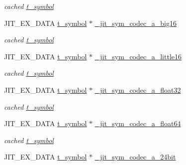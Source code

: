 \begin{DoxyCompactItemize}
\begin{DoxyCompactList}\small\item\em cached \hyperlink{structt__symbol}{t\_\-symbol} \item\end{DoxyCompactList}\item 
\hypertarget{group__jitter_ga95acadbe30725ccc610bec32f125706b}{
JIT\_\-EX\_\-DATA \hyperlink{structt__symbol}{t\_\-symbol} $\ast$ \hyperlink{group__jitter_ga95acadbe30725ccc610bec32f125706b}{\_\-jit\_\-sym\_\-codec\_\-a\_\-big16}}
\label{group__jitter_ga95acadbe30725ccc610bec32f125706b}

\begin{DoxyCompactList}\small\item\em cached \hyperlink{structt__symbol}{t\_\-symbol} \item\end{DoxyCompactList}\item 
\hypertarget{group__jitter_ga168b47dccac2a7b92bf74c9dc2e58378}{
JIT\_\-EX\_\-DATA \hyperlink{structt__symbol}{t\_\-symbol} $\ast$ \hyperlink{group__jitter_ga168b47dccac2a7b92bf74c9dc2e58378}{\_\-jit\_\-sym\_\-codec\_\-a\_\-little16}}
\label{group__jitter_ga168b47dccac2a7b92bf74c9dc2e58378}

\begin{DoxyCompactList}\small\item\em cached \hyperlink{structt__symbol}{t\_\-symbol} \item\end{DoxyCompactList}\item 
\hypertarget{group__jitter_ga4a788b64cf74f82a96a5a16b5ccef259}{
JIT\_\-EX\_\-DATA \hyperlink{structt__symbol}{t\_\-symbol} $\ast$ \hyperlink{group__jitter_ga4a788b64cf74f82a96a5a16b5ccef259}{\_\-jit\_\-sym\_\-codec\_\-a\_\-float32}}
\label{group__jitter_ga4a788b64cf74f82a96a5a16b5ccef259}

\begin{DoxyCompactList}\small\item\em cached \hyperlink{structt__symbol}{t\_\-symbol} \item\end{DoxyCompactList}\item 
\hypertarget{group__jitter_ga82c22b2f399ca7ff872cfa95b12358ee}{
JIT\_\-EX\_\-DATA \hyperlink{structt__symbol}{t\_\-symbol} $\ast$ \hyperlink{group__jitter_ga82c22b2f399ca7ff872cfa95b12358ee}{\_\-jit\_\-sym\_\-codec\_\-a\_\-float64}}
\label{group__jitter_ga82c22b2f399ca7ff872cfa95b12358ee}

\begin{DoxyCompactList}\small\item\em cached \hyperlink{structt__symbol}{t\_\-symbol} \item\end{DoxyCompactList}\item 
\hypertarget{group__jitter_ga8dcb12ac957391cff21bebb38f9d1905}{
JIT\_\-EX\_\-DATA \hyperlink{structt__symbol}{t\_\-symbol} $\ast$ \hyperlink{group__jitter_ga8dcb12ac957391cff21bebb38f9d1905}{\_\-jit\_\-sym\_\-codec\_\-a\_\-24bit}}
\label{group__jitter_ga8dcb12ac957391cff21bebb38f9d1905}


\end{DoxyCompactItemize}
